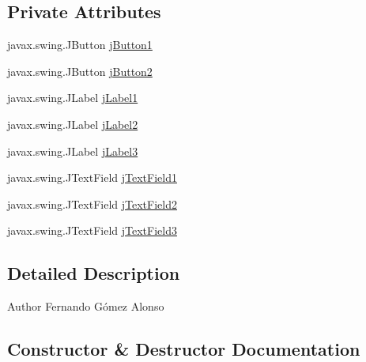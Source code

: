 \subsection*{Private Attributes}
\begin{DoxyCompactItemize}
\item 
javax.\+swing.\+J\+Button \mbox{\hyperlink{class_interfaz_package_1_1_busqueda_facturas_aef5c93b206e8f2f6983c85a8cdbc95d1}{j\+Button1}}
\item 
javax.\+swing.\+J\+Button \mbox{\hyperlink{class_interfaz_package_1_1_busqueda_facturas_a667ec2eeb636b4f1822e8f77376ec3ca}{j\+Button2}}
\item 
javax.\+swing.\+J\+Label \mbox{\hyperlink{class_interfaz_package_1_1_busqueda_facturas_a3cb5b1df90ba3c664ab24c9ddc288a2e}{j\+Label1}}
\item 
javax.\+swing.\+J\+Label \mbox{\hyperlink{class_interfaz_package_1_1_busqueda_facturas_ad742b0bf64188b05a8296fd972b67b47}{j\+Label2}}
\item 
javax.\+swing.\+J\+Label \mbox{\hyperlink{class_interfaz_package_1_1_busqueda_facturas_a92d227beb642242b3952cdd159970c32}{j\+Label3}}
\item 
javax.\+swing.\+J\+Text\+Field \mbox{\hyperlink{class_interfaz_package_1_1_busqueda_facturas_ac7cfc9bbf0501c53bb3014890e92efc2}{j\+Text\+Field1}}
\item 
javax.\+swing.\+J\+Text\+Field \mbox{\hyperlink{class_interfaz_package_1_1_busqueda_facturas_a3bc720241bb5aea5badbbc7937d79292}{j\+Text\+Field2}}
\item 
javax.\+swing.\+J\+Text\+Field \mbox{\hyperlink{class_interfaz_package_1_1_busqueda_facturas_aadd306dde44841b9ab43c6753b3df0d7}{j\+Text\+Field3}}
\end{DoxyCompactItemize}


\subsection{Detailed Description}
\begin{DoxyAuthor}{Author}
Fernando Gómez Alonso 
\end{DoxyAuthor}


\subsection{Constructor \& Destructor Documentation}
\mbox{\label{class_interfaz_package_1_1_busqueda_facturas_ab8143adc0ff8d4b0bd5d726a3930e0f7}} 
